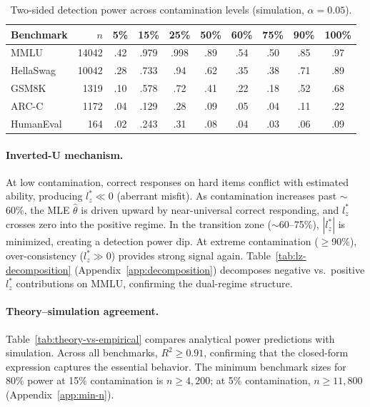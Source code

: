 \documentclass[11pt,a4paper]{article}
\begin{document}
\begin{table}[t]
\centering
\small
\caption{Two-sided detection power across contamination levels (simulation, $\alpha{=}0.05$).}
\label{tab:sim-power}
\begin{tabular}{lrcccccccc}
\toprule
\textbf{Benchmark} & $n$ & \textbf{5\%} & \textbf{15\%} & \textbf{25\%} & \textbf{50\%} & \textbf{60\%} & \textbf{75\%} & \textbf{90\%} & \textbf{100\%} \\
\midrule
MMLU & 14042 & .42 & .979 & .998 & .89 & .54 & .50 & .85 & .97 \\
HellaSwag & 10042 & .28 & .733 & .94 & .62 & .35 & .38 & .71 & .89 \\
GSM8K & 1319 & .10 & .578 & .72 & .41 & .22 & .18 & .52 & .68 \\
ARC-C & 1172 & .04 & .129 & .28 & .09 & .05 & .04 & .11 & .22 \\
HumanEval & 164 & .02 & .243 & .31 & .08 & .04 & .03 & .06 & .09 \\
\bottomrule
\end{tabular}
\end{table}

\paragraph{Inverted-U mechanism.}
At low contamination, correct responses on hard items conflict with estimated ability, producing $l_z^* \ll 0$ (aberrant misfit).
As contamination increases past $\sim$60\%, the MLE $\hat{\theta}$ is driven upward by near-universal correct responding, and $l_z^*$ crosses zero into the positive regime.
In the transition zone ($\sim$60--75\%), $|l_z^*|$ is minimized, creating a detection power dip.
At extreme contamination ($\geq$90\%), over-consistency ($l_z^* \gg 0$) provides strong signal again.
Table~\ref{tab:lz-decomposition} (Appendix~\ref{app:decomposition}) decomposes negative vs.\ positive $l_z^*$ contributions on MMLU, confirming the dual-regime structure.

\paragraph{Theory--simulation agreement.}
Table~\ref{tab:theory-vs-empirical} compares analytical power predictions with simulation.
Across all benchmarks, $R^2 \geq 0.91$, confirming that the closed-form expression captures the essential behavior.
The minimum benchmark sizes for 80\% power at 15\% contamination is $n \geq 4{,}200$; at 5\% contamination, $n \geq 11{,}800$ (Appendix~\ref{app:min-n}).
\end{document}
